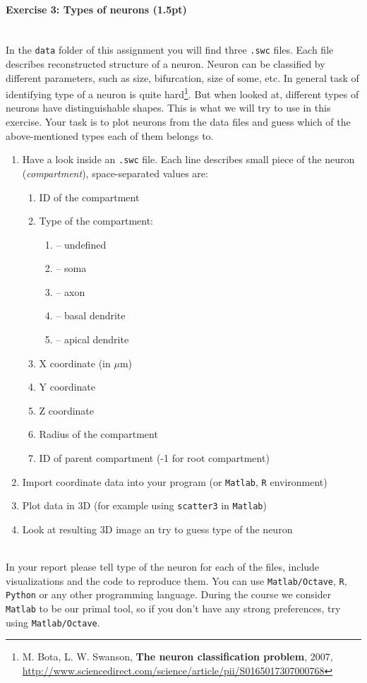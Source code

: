 \documentclass[a4paper,11pt]{article}
\newenvironment{exercise}[3]{\paragraph{Exercise #1: #2 (#3pt)}\ \\}{
\medskip}
\begin{document}
\begin{exercise}{3}{Types of neurons}{1.5}
In the \texttt{data} folder of this assignment you will find three \texttt{.swc} files. Each file describes reconstructed structure of a neuron. Neuron can be classified by different parameters, such as size, bifurcation, size of some, etc. In general task of identifying type of a neuron is quite hard\footnote{M. Bota, L. W. Swanson, \textbf{The neuron classification problem}, 2007, 
\url{http://www.sciencedirect.com/science/article/pii/S0165017307000768}}. But when looked at, different types of neurons have distinguishable shapes. This is what we will try to use in this exercise. Your task is to plot neurons from the data files and guess which of the above-mentioned types each of them belongs to.
\begin{enumerate}
	\item Have a look inside an \texttt{.swc} file. Each line describes small piece of the neuron (\emph{compartment}), space-separated values are: 
	\begin{enumerate}
		\item ID of the compartment
		\item Type of the compartment:
		\begin{enumerate}
			\item[0] -- undefined
			\item[1] -- soma
			\item[2] -- axon
			\item[3] -- basal dendrite
			\item[4] -- apical dendrite
		\end{enumerate}
		\item X coordinate (in $\mu$m)
		\item Y coordinate
		\item Z coordinate	
		\item Radius of the compartment
		\item ID of parent compartment (-1 for root compartment)
	\end{enumerate}
	\item Import coordinate data into your program (or \texttt{Matlab}, \texttt{R} environment)
	\item Plot data in 3D (for example using \texttt{scatter3} in \texttt{Matlab})
	\item Look at resulting 3D image an try to guess type of the neuron
\end{enumerate}
\ \\
In your report please tell type of the neuron for each of the files, include visualizations and the code to reproduce them. You can use \texttt{Matlab/Octave}, \texttt{R}, \texttt{Python} or any other programming language. During the course we consider \texttt{Matlab} to be our primal tool, so if you don't have any strong preferences, try using \texttt{Matlab/Octave}.
\end{exercise}
\end{document}
